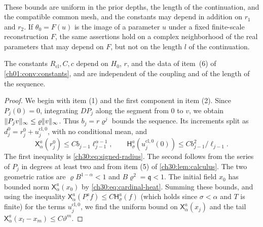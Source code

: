 \begin{lemma}
\begin{enumerate}
\[\begin{gathered}
 \end{gathered}
\]
These bounds are uniform in the prior depths, the length of the continuation, and the compatible common mesh, and the constants may depend in addition on $r_1$ and $r_2$. If $\theta_0=F(u)$ is the image of a parameter $u$ under a fixed finite-scale reconstruction $F$, the same assertions hold on a complex neighborhood of the real parameters that may depend on $F$, but not on the length $l$ of the continuation.
\end{enumerate}
The constants $R_{\mathrm{cl}},C,c$ depend on $H_0$, $r$, and the data of item~(6) of \cref{ch01:conv:constants}, and are independent of the coupling and of the length of the sequence.
\end{lemma}

\begin{proof}
We begin with item (1) and the first component in item (2). Since $P_j(0)=0$, integrating $DP_j$ along the segment from $0$ to $v$, we obtain $\lVert P_jv\rVert_\infty\le\varrho\lVert v\rVert_\infty$. Thus $b_j=r\varrho^j$ bounds the sequence. Its increments split as $d_j^0=r_j^0+u_j^{\mathrm{cl},0}$, with no conditional mean, and
\begin{equation}\label{ch30:eq:classical-adjacent}
 \mathsf X_\alpha^a(r_j^0)\le Cb_{j-1}\ell_{j-1}^{\alpha-1},\qquad
 \mathsf H_\sigma^a(u_j^{\mathrm{cl},0}(0))\le Cb_{j-1}^2/\ell_{j-1}.
\end{equation}
The first inequality is \eqref{ch30:eq:signed-radius}. The second follows from the series of $P_j$ in degrees at least two and from item (5) of \cref{ch30:lem:calculus}. The two geometric ratios are $\varrho B^{1-\alpha}<1$ and $B\varrho^2=\mathfrak q<1$. The initial field $x_0$ has bounded norm $\mathsf X_\alpha^a(x_0)$ by \eqref{ch30:eq:cardinal-heat}. Summing these bounds, and using the inequality $\mathsf X_\alpha^a(P_\cdot^af)\le C\mathsf H_\sigma^a(f)$ (which holds since $\sigma<\alpha$ and $T$ is finite) for the terms $u_j^{\mathrm{cl},0}$, we find the uniform bound on $\mathsf X_\alpha^a(x_j)$ and the tail $\mathsf X_\alpha^a(x_l-x_m)\le C\vartheta^m$.


\end{proof}
